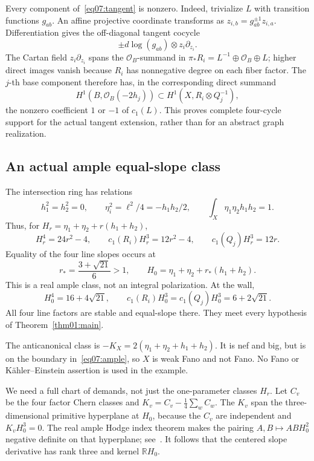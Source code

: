 \documentclass[11pt]{amsart}
\theoremstyle{definition}
\theoremstyle{remark}
\newcommand{\RR}{\mathbb R}
\begin{document}
Every component of~\eqref{eq07:tangent} is nonzero.
Indeed, trivialize \(L\) with transition functions \(g_{ab}\).
An affine projective coordinate transforms as
\(z_{i,b}=g_{ab}^{\pm1}z_{i,a}\). Differentiation gives the
off-diagonal tangent cocycle
\[
 \pm d\log(g_{ab})\otimes z_i\partial_{z_i}.
\]
The Cartan field \(z_i\partial_{z_i}\) spans the
\(\mathcal O_B\)-summand in
\(\pi_*R_i=L^{-1}\oplus\mathcal O_B\oplus L\);
higher direct images vanish because \(R_i\) has nonnegative
degree on each fiber factor. The \(j\)-th base component
therefore has, in the corresponding direct summand
\[
 H^1(B,\mathcal O_B(-2h_j))
 \subset H^1(X,R_i\otimes Q_j^{-1}),
\]
the nonzero coefficient \(1\) or \(-1\) of \(c_1(L)\).
This proves complete four-cycle support for the actual tangent
extension, rather than for an abstract graph realization.

\subsection{An actual ample equal-slope class}

The intersection ring has relations
\[
 h_1^2=h_2^2=0,\qquad
 \eta_i^2=\ell^2/4=-h_1h_2/2,\qquad
 \int_X\eta_1\eta_2h_1h_2=1.
\]
Thus, for \(H_r=\eta_1+\eta_2+r(h_1+h_2)\),
\begin{equation}\label{eq07:degrees}
 H_r^4=24r^2-4,\qquad
 c_1(R_i)H_r^3=12r^2-4,\qquad
 c_1(Q_j)H_r^3=12r.
\end{equation}
Equality of the four line slopes occurs at
\begin{equation}\label{eq07:wall}
 r_*=\frac{3+\sqrt{21}}6>1,\qquad
 H_0=\eta_1+\eta_2+r_*(h_1+h_2).
\end{equation}
This is a real ample class, not an integral polarization.
At the wall,
\[
 H_0^4=16+4\sqrt{21},\qquad
 c_1(R_i)H_0^3=c_1(Q_j)H_0^3=6+2\sqrt{21}.
\]
All four line factors are stable and equal-slope there.
They meet every hypothesis of Theorem~\ref{thm01:main}.

The anticanonical class is
\(-K_X=2(\eta_1+\eta_2+h_1+h_2)\).
It is nef and big, but is on the boundary in~\eqref{eq07:ample},
so \(X\) is weak Fano and not Fano. No Fano or
Kähler--Einstein assertion is used in the example.

We need a full chart of demands, not just the one-parameter
classes \(H_r\).
Let \(C_v\) be the four factor Chern classes and
\(K_v=C_v-\frac14\sum_w C_w\).
The \(K_v\) span the three-dimensional primitive hyperplane
at \(H_0\), because the \(C_v\) are independent and
\(K_vH_0^3=0\).
The real ample Hodge index theorem makes the pairing
\(A,B\mapsto ABH_0^2\) negative definite on that hyperplane;
see~\cite[Theorem 6.4 and Corollary 6.5]{grebrosstoma2016}.
It follows that the centered slope derivative has rank three
and kernel \(\RR H_0\).
\end{document}
